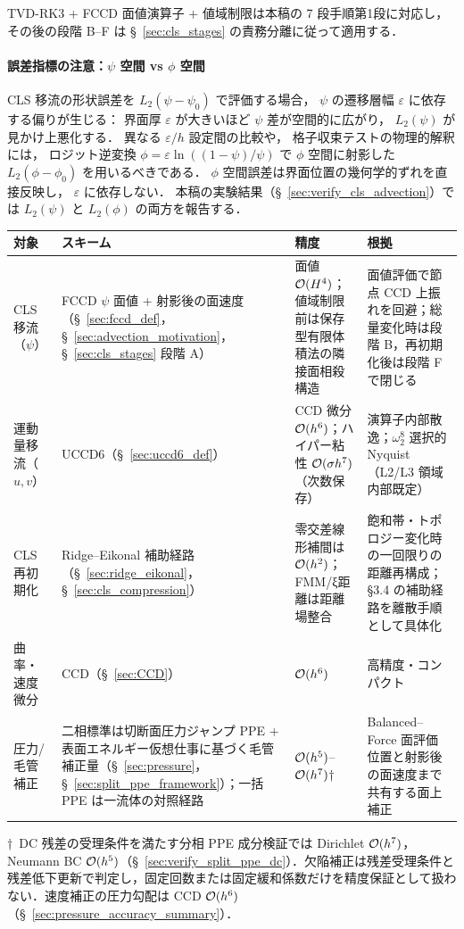 \label{alg:dccd_adv}%
TVD-RK3 + FCCD 面値演算子 + 値域制限は本稿の 7 段手順第1段に対応し，
その後の段階 B--F は §~\ref{sec:cls_stages} の責務分離に従って適用する．

\paragraph{誤差指標の注意：$\psi$ 空間 vs $\phi$ 空間}
CLS 移流の形状誤差を $L_2(\psi - \psi_0)$ で評価する場合，
$\psi$ の遷移層幅 $\varepsilon$ に依存する偏りが生じる：
界面厚 $\varepsilon$ が大きいほど $\psi$ 差が空間的に広がり，
$L_2(\psi)$ が見かけ上悪化する．
異なる $\varepsilon/h$ 設定間の比較や，
格子収束テストの物理的解釈には，
ロジット逆変換 $\phi = \varepsilon\ln((1-\psi)/\psi)$
で $\phi$ 空間に射影した $L_2(\phi - \phi_0)$ を用いるべきである．
$\phi$ 空間誤差は界面位置の幾何学的ずれを直接反映し，
$\varepsilon$ に依存しない．
本稿の実験結果（§~\ref{sec:verify_cls_advection}）では
$L_2(\psi)$ と $L_2(\phi)$ の両方を報告する．

\begin{tcolorbox}[mybox, title={本稿の空間離散化スキームの役割分担}]
\label{box:scheme_roles}
\begin{center}
\renewcommand{\arraystretch}{\PaperTableArrayStretch}
\begin{tabular}{>{\raggedright\arraybackslash}p{2.5cm}>{\raggedright\arraybackslash}p{3.8cm}>{\raggedright\arraybackslash}p{1.5cm}>{\raggedright\arraybackslash}p{4cm}}
\hline
対象 & スキーム & 精度 & 根拠 \\
\hline
CLS 移流（$\psi$） & FCCD $\psi$ 面値 + 射影後の面速度（§~\ref{sec:fccd_def}，§~\ref{sec:advection_motivation}，§~\ref{sec:cls_stages} 段階 A） & 面値 $\mathcal{O}(H^4)$；値域制限前は保存型有限体積法の隣接面相殺構造 & 面値評価で節点 CCD 上振れを回避；総量変化時は段階 B，再初期化後は段階 F で閉じる \\
運動量移流（$u,v$） & UCCD6（§~\ref{sec:uccd6_def}） & CCD 微分 $\mathcal{O}(h^6)$；ハイパー粘性 $\mathcal{O}(\sigma h^7)$（次数保存） & 演算子内部散逸；$\omega_2^8$ 選択的 Nyquist（L2/L3 領域内部既定） \\
CLS 再初期化 & Ridge--Eikonal 補助経路（§~\ref{sec:ridge_eikonal}，§~\ref{sec:cls_compression}） & 零交差線形補間は $\mathcal{O}(h^2)$；FMM/ξ距離は距離場整合 & 飽和帯・トポロジー変化時の一回限りの距離再構成；§3.4 の補助経路を離散手順として具体化 \\
曲率・速度微分 & CCD（§~\ref{sec:CCD}） & $\mathcal{O}(h^6)$ & 高精度・コンパクト \\
圧力/毛管補正 & 二相標準は切断面圧力ジャンプ PPE + 表面エネルギー仮想仕事に基づく毛管補正量（§~\ref{sec:pressure}，§~\ref{sec:split_ppe_framework}）；一括 PPE は一流体の対照経路 & $\mathcal{O}(h^5)$--$\mathcal{O}(h^7)$† & Balanced--Force 面評価位置と射影後の面速度まで共有する面上補正 \\
\hline
\end{tabular}
\end{center}
{\small †\ DC 残差の受理条件を満たす分相 PPE 成分検証では Dirichlet $\mathcal{O}(h^7)$，Neumann BC $\mathcal{O}(h^5)$（§~\ref{sec:verify_split_ppe_dc}）．欠陥補正は残差受理条件と残差低下更新で判定し，固定回数または固定緩和係数だけを精度保証として扱わない．速度補正の圧力勾配は CCD $\mathcal{O}(h^6)$（§~\ref{sec:pressure_accuracy_summary}）．}
\end{tcolorbox}
